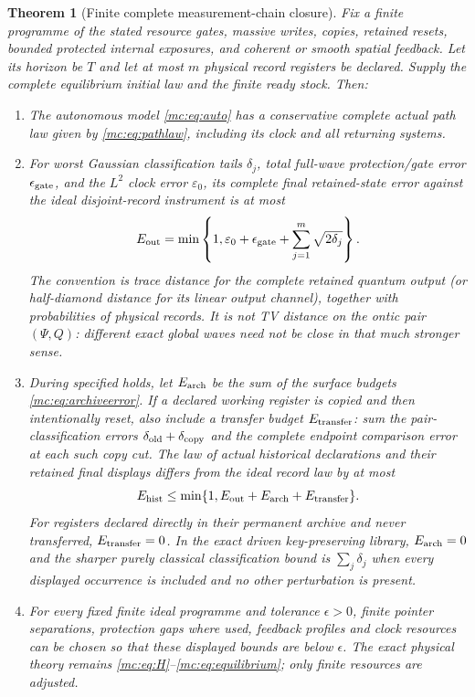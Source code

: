 \documentclass[11pt,oneside,openany]{book}
\newtheorem{theorem}{Theorem}[chapter]
\theoremstyle{definition}
\theoremstyle{remark}\newtheorem{remark}[theorem]{Remark}
\begin{document}
\begin{theorem}[Finite complete measurement-chain closure]\label{mc:closure}
Fix a finite programme of the stated resource gates, massive writes, copies, retained resets, bounded protected internal exposures, and coherent or smooth spatial feedback. Let its horizon be $T$ and let at most $m$ physical record registers be declared. Supply the complete equilibrium initial law and the finite ready stock. Then:
\begin{enumerate}
\item The autonomous model \eqref{mc:eq:auto} has a conservative complete actual path law given by \eqref{mc:eq:pathlaw}, including its clock and all returning systems.
\item For worst Gaussian classification tails $\delta_j$, total full-wave protection/gate error $\epsilon_{\rm gate}$, and the $L^2$ clock error $\varepsilon_0$, its complete final retained-state error against the ideal disjoint-record instrument is at most
\begin{equation}\label{mc:eq:totalwave}
 E_{\rm out}=\min\left\{1,\varepsilon_0+\epsilon_{\rm gate}
                                  +\sum_{j=1}^m\sqrt{2\delta_j}\right\}.
\end{equation}
The convention is trace distance for the complete retained quantum output (or half-diamond distance for its linear output channel), together with probabilities of physical records. It is not TV distance on the ontic pair $(\Psi,Q)$: different exact global waves need not be close in that much stronger sense.
\item During specified holds, let $E_{\rm arch}$ be the sum of the surface budgets \eqref{mc:eq:archiveerror}. If a declared working register is copied and then intentionally reset, also include a transfer budget $E_{\rm transfer}$: sum the pair-classification errors $\delta_{\rm old}+\delta_{\rm copy}$ and the complete endpoint comparison error at each such copy cut. The law of actual historical declarations and their retained final displays differs from the ideal record law by at most
\begin{equation}\label{mc:eq:totalhist}
 E_{\rm hist}\le\min\{1,E_{\rm out}+E_{\rm arch}+E_{\rm transfer}\}.
\end{equation}
For registers declared directly in their permanent archive and never transferred, $E_{\rm transfer}=0$. In the exact driven key-preserving library, $E_{\rm arch}=0$ and the sharper purely classical classification bound is $\sum_j\delta_j$ when every displayed occurrence is included and no other perturbation is present.
\item For every fixed finite ideal programme and tolerance $\epsilon>0$, finite pointer separations, protection gaps where used, feedback profiles and clock resources can be chosen so that these displayed bounds are below $\epsilon$. The exact physical theory remains \eqref{mc:eq:H}--\eqref{mc:eq:equilibrium}; only finite resources are adjusted.
\end{enumerate}
\end{theorem}
\end{document}
